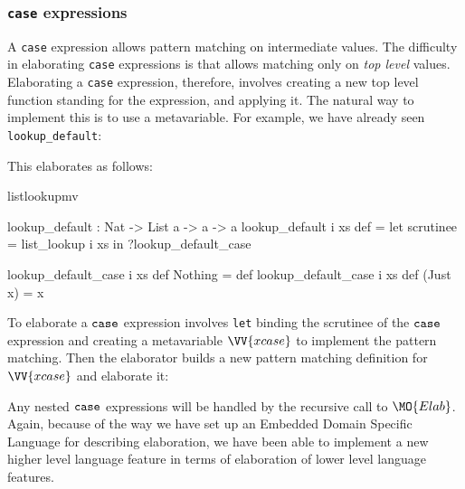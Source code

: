 
\subsubsection{\texttt{case} expressions}

A \texttt{case} expression allows pattern matching on intermediate values. The difficulty
in elaborating \texttt{case} expressions is that \TT{} allows matching only on
\emph{top level} values. Elaborating a \texttt{case} expression, therefore,
involves creating a new top level function standing for the expression, and applying it. 
The natural
way to implement this is to use a metavariable. For example, we have already seen
\texttt{lookup\_default}:


\noindent
This elaborates as follows:

\begin{SaveVerbatim}{listlookupmv}

lookup_default : Nat -> List a -> a -> a
lookup_default i xs def = 
   let scrutinee = list_lookup i xs in ?lookup_default_case

lookup_default_case i xs def Nothing  = def
lookup_default_case i xs def (Just x) = x

\end{SaveVerbatim}

To elaborate a $\mathtt{case}$ expression involves \texttt{let} binding the scrutinee of
the $\mathtt{case}$ expression and creating a metavariable $\VV{xcase}$ to implement the
pattern matching. Then the elaborator builds a new pattern matching definition for $\VV{xcase}$
and elaborate it:


Any nested $\mathtt{case}$ expressions will be handled by the recursive call to
$\MO{Elab}$. Again, because of the way we have set up an Embedded Domain Specific
Language for describing elaboration, we have been able to implement a new higher
level language feature in terms of elaboration of lower level language features.






